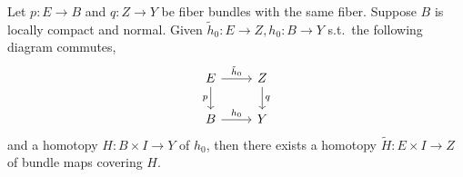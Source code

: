 \documentclass[12pt,class=article,crop=false]{standalone}
\begin{document}
\begin{thm}
Let $ p: E \to B$ and $ q: Z \to Y$ be fiber bundles with the same fiber. Suppose $ B $ is locally compact and normal. Given  $ \widetilde{ h}_0: E \to Z, h_0: B \to Y$ s.t.\  the following diagram commutes,
\[\begin{tikzcd}
	E & Z \\
	B & Y
	\arrow["{\tilde{h}_0}", from=1-1, to=1-2]
	\arrow["q", from=1-2, to=2-2]
	\arrow["p"', from=1-1, to=2-1]
	\arrow["{h_0}", from=2-1, to=2-2]
\end{tikzcd}\]
and a homotopy $ H: B \times I \to Y$ of $ h_0$, then there exists a homotopy $ \widetilde{ H}: E \times I \to Z$ of bundle maps covering $ H$.
\end{thm}
\end{document}
